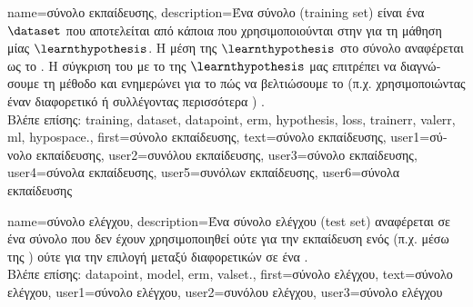 {name={\foreignlanguage{greek}{σύνολο εκπαίδευσης}},
	description={\foreignlanguage{greek}{Ένα σύνολο}  (training set)  
		\foreignlanguage{greek}{είναι ένα}  $\dataset$ \foreignlanguage{greek}{που αποτελείται από κάποια} 
		 \foreignlanguage{greek}{που χρησιμοποι\-ού\-νται στην}  \foreignlanguage{greek}{για τη μάθηση 
		μίας}  $\learnthypothesis$. \foreignlanguage{greek}{Η μέση}  \foreignlanguage{greek}{της 
		$\learnthypothesis$ στο σύνολο}  \foreignlanguage{greek}{αναφέρεται ως το} . 
		\foreignlanguage{greek}{Η σύγκριση του}  \foreignlanguage{greek}{με το}  
		 \foreignlanguage{greek}{της $\learnthypothesis$ μας επιτρέπει να διαγνώσουμε τη μέθοδο}  
		\foreignlanguage{greek}{και ενημερώνει για το πώς να βελτιώσουμε το}  
		\foreignlanguage{greek}{(π.χ. χρησιμοποιώντας έναν διαφορετικό}  
		\foreignlanguage{greek}{ή συλλέγοντας περισσότερα} ) \cite[\foreignlanguage{greek}{Ενότητα} 6.6]{MLBasics}.
		\\
		\foreignlanguage{greek}{Βλέπε επίσης:} \gls{training}, \gls{dataset}, \gls{datapoint}, \gls{erm}, \gls{hypothesis}, \gls{loss}, \gls{trainerr}, 
		\gls{valerr}, \gls{ml}, \gls{hypospace}.},
	first={\foreignlanguage{greek}{σύνολο εκπαίδευσης}},
	text={\foreignlanguage{greek}{σύ\-νο\-λο εκ\-παί\-δευ\-σης}},
	user1={\foreignlanguage{greek}{σύνολο εκπαίδευσης}}, %
	user2={\foreignlanguage{greek}{συνόλου εκ\-παί\-δευ\-σης}}, %
	user3={\foreignlanguage{greek}{σύνολο εκπαί\-δευσης}}, %
	user4={\foreignlanguage{greek}{σύνολα εκπαίδευσης}}, %
	user5={\foreignlanguage{greek}{συνόλων εκπαί\-δευ\-σης}}, %
	user6={\foreignlanguage{greek}{σύνολα εκπαίδευσης}} %
}

{name={\foreignlanguage{greek}{σύνολο ελέγχου}},
	description={\foreignlanguage{greek}{Ένα σύνολο ελέγχου} (test set) 
		\foreignlanguage{greek}{αναφέρεται σε ένα σύνολο}  
		\foreignlanguage{greek}{που δεν έχουν χρησιμοποιηθεί ούτε για την εκ\-παί\-δευση ενός}  
		(\foreignlanguage{greek}{π.χ. μέσω της} ) \foreignlanguage{greek}{ούτε για την επιλογή μεταξύ 
		διαφορετικών}  \foreignlanguage{greek}{σε ένα} .
		\\
		\foreignlanguage{greek}{Βλέπε επίσης:} \gls{datapoint}, \gls{model}, \gls{erm}, \gls{valset}.},
	first={\foreignlanguage{greek}{σύνολο ελέγχου}},
	text={\foreignlanguage{greek}{σύνολο ελέγχου}}, 
	user1={\foreignlanguage{greek}{σύνολο ελέγχου}}, %
	user2={\foreignlanguage{greek}{συνόλου ελέγχου}}, %
	user3={\foreignlanguage{greek}{σύνολο ελέγχου}} %
}

